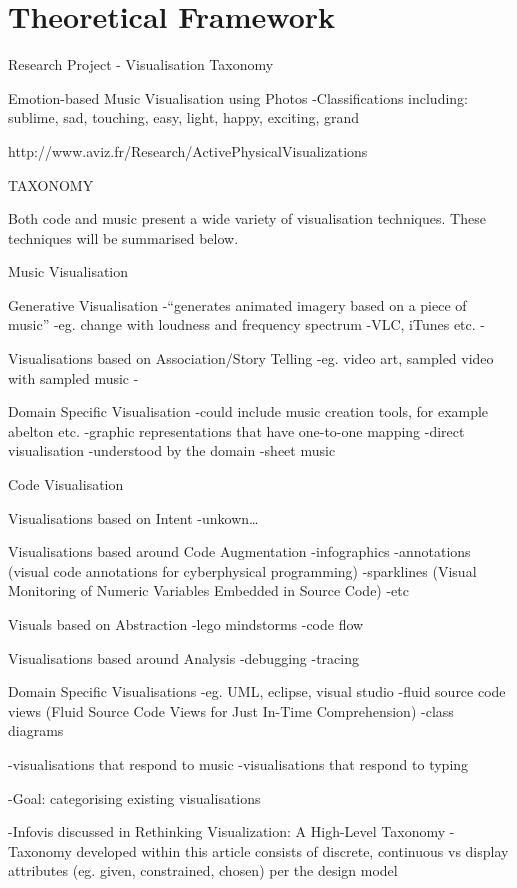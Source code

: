 \section{Theoretical Framework}
\label{sec:framework}

Research Project - Visualisation Taxonomy


Emotion-based Music Visualisation using Photos
-Classifications including: sublime, sad, touching, easy, light, happy, exciting, grand

http://www.aviz.fr/Research/ActivePhysicalVisualizations




TAXONOMY

Both code and music present a wide variety of visualisation techniques. These techniques will be summarised below.

Music Visualisation

Generative Visualisation
-“generates animated imagery based on a piece of music”
-eg. change with loudness and frequency spectrum
-VLC, iTunes etc.
-

Visualisations based on Association/Story Telling
-eg. video art, sampled video with sampled music
-

Domain Specific Visualisation
-could include music creation tools, for example abelton etc.
-graphic representations that have one-to-one mapping
-direct visualisation
-understood by the domain
-sheet music


Code Visualisation

Visualisations based on Intent
-unkown…

Visualisations based around Code Augmentation
-infographics
-annotations (visual code annotations for cyberphysical programming)
-sparklines (Visual Monitoring of Numeric Variables Embedded in Source Code)
-etc

Visuals based on Abstraction
-lego mindstorms
-code flow

Visualisations based around Analysis
-debugging
-tracing

Domain Specific Visualisations
-eg. UML, eclipse, visual studio
-fluid source code views (Fluid Source Code Views for Just In-Time Comprehension)
-class diagrams




-visualisations that respond to music
-visualisations that respond to typing



-Goal: categorising existing visualisations

-Infovis discussed in Rethinking Visualization: A High-Level Taxonomy
-Taxonomy developed within this article consists of {discrete, continuous} vs display attributes (eg. given, constrained, chosen) per the design model



